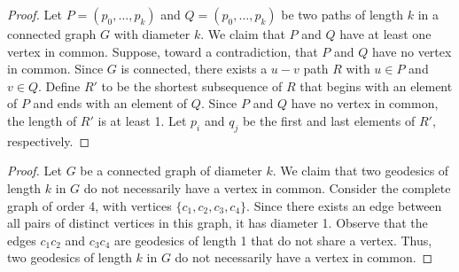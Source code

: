 \documentclass[12pt]{article}
\begin{document}
\begin{proof}
    Let $P=(p_0, \hdots, p_k)$ and $Q=(p_0, \hdots, p_k)$ be two paths of length $k$ in a connected graph $G$ with diameter $k$.
    We claim that $P$ and $Q$ have at least one vertex in common.
    Suppose, toward a contradiction, that $P$ and $Q$ have no vertex in common.
    Since $G$ is connected, there exists a $u-v$ path $R$ with $u \in P$ and $v \in Q$.
    Define $R'$ to be the shortest subsequence of $R$ that begins with an element of $P$ and ends with an element of $Q$.
    Since $P$ and $Q$ have no vertex in common, the length of $R'$ is at least 1.
    Let $p_i$ and $q_j$ be the first and last elements of $R'$, respectively.
\end{proof}

\medskip
{}
\begin{proof}
    Let $G$ be a connected graph of diameter $k$.
    We claim that two geodesics of length $k$ in $G$ do not necessarily have a vertex in common.
    Consider the complete graph of order 4, with vertices $\{c_1, c_2, c_3, c_4\}$.
    Since there exists an edge between all pairs of distinct vertices in this graph, it has diameter 1.
    Observe that the edges $c_1c_2$ and $c_3c_4$ are geodesics of length 1 that do not share a vertex.
    Thus, two geodesics of length $k$ in $G$ do not necessarily have a vertex in common.
\end{proof}

\bigskip
{}
\end{document}

